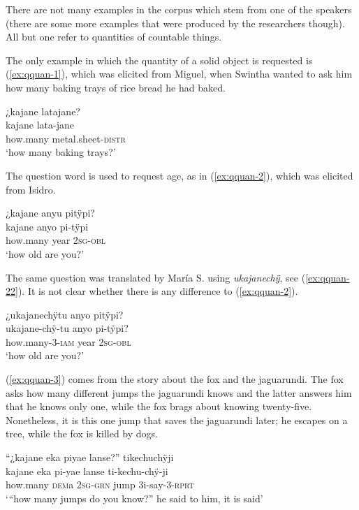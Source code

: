 There are not many examples in the corpus which stem from one of the speakers (there are some more examples that were produced by the researchers though). All but one refer to quantities of countable things.

The only example in which the quantity of a solid object is requested is (\ref{ex:qquan-1}), which was elicited from Miguel, when Swintha wanted to ask him how many baking trays of rice bread he had baked.

\ea\label{ex:qquan-1}
\begingl
\glpreamble ¿kajane latajane?\\
\gla kajane lata-jane\\
\glb how.many metal.sheet-\textsc{distr}\\
\glft ‘how many baking trays?’
\endgl
\trailingcitation{[mxx-e120415ls.093]}
\xe

The question word is used to request age, as in (\ref{ex:qquan-2}), which was elicited from Isidro.

\ea\label{ex:qquan-2}
\begingl
\glpreamble ¿kajane anyu pitÿpi?\\
\gla kajane anyo pi-tÿpi\\
\glb how.many year 2\textsc{sg}-\textsc{obl}\\
\glft ‘how old are you?’
\endgl
\trailingcitation{[dxx-d120416s.073]}
\xe

The same question was translated by María S. using \textit{ukajanechÿ}, see (\ref{ex:qquan-22}). It is not clear whether there is any difference to (\ref{ex:qquan-2}).

\ea\label{ex:qquan-22}
\begingl
\glpreamble ¿ukajanechÿtu anyo pitÿpi?\\
\gla ukajane-chÿ-tu anyo pi-tÿpi?\\
\glb how.many-3-\textsc{iam} year 2\textsc{sg}-\textsc{obl}\\
\glft ‘how old are you?’
\endgl
\trailingcitation{[rxx-e151017l]}
\xe

(\ref{ex:qquan-3}) comes from the story about the fox and the jaguarundi. The fox asks how many different jumps the jaguarundi knows and the latter answers him that he knows only one, while the fox brags about knowing twenty-five. Nonetheless, it is this one jump that saves the jaguarundi later; he escapes on a tree, while the fox is killed by dogs.

\ea\label{ex:qquan-3}
\begingl
\glpreamble “¿kajane eka piyae lanse?” tikechuchÿji\\
\gla kajane eka pi-yae lanse ti-kechu-chÿ-ji\\
\glb how.many \textsc{dem}a 2\textsc{sg}-\textsc{grn} jump 3i-say-3-\textsc{rprt}\\
\glft ‘“how many jumps do you know?” he said to him, it is said’
\endgl
\trailingcitation{[jmx-n120429ls-x5.355]}
\xe

